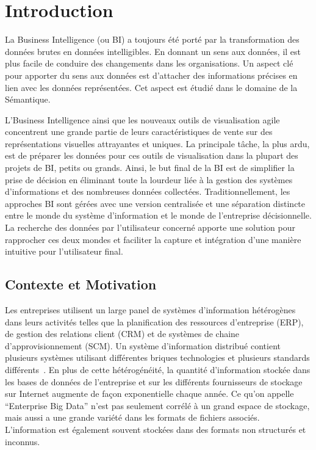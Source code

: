 \chapter{Introduction}\label{french-introduction}
\graphicspath{{summary/figures/}}

\newcommand{\bi}{Business Intelligence }

La Business Intelligence (ou BI) a toujours \'{e}t\'{e} port\'{e} par la transformation des donn\'{e}es brutes en donn\'{e}es intelligibles. En donnant un sens aux donn\'{e}es, il est plus facile de conduire des changements dans les organisations. Un aspect cl\'{e} pour apporter du sens aux donn\'{e}es est d'attacher des informations pr\'{e}cises en lien avec les donn\'{e}es repr\'{e}sent\'{e}es. Cet aspect est \'{e}tudi\'{e} dans le domaine de la S\'{e}mantique.

L'\bi ainsi que les nouveaux outils de visualisation agile concentrent une grande partie de leurs caract\'{e}ristiques de vente sur des repr\'{e}sentations visuelles attrayantes et uniques. La principale tâche, la plus ardu, est de pr\'{e}parer les donn\'{e}es pour ces outils de visualisation dans la plupart des projets de BI, petits ou grands. Ainsi, le but final de la BI est de simplifier la prise de d\'{e}cision en \'{e}liminant toute la lourdeur li\'{e}e à la gestion des syst\`{e}mes d'informations et des nombreuses donn\'{e}es collect\'{e}es. Traditionnellement, les approches BI sont g\'{e}r\'{e}es avec une version centralis\'{e}e et une s\'{e}paration distincte entre le monde du syst\`{e}me d'information et le monde de l'entreprise d\'{e}cisionnelle. La recherche des donn\'{e}es par l'utilisateur concern\'{e} apporte une solution pour rapprocher ces deux mondes et faciliter la capture et int\'{e}gration d'une mani\`{e}re intuitive pour l'utilisateur final.

\section{Contexte et Motivation}

Les entreprises utilisent un large panel de syst\`{e}mes d'information h\'{e}t\'{e}rog\`{e}nes dans leurs activit\'{e}s telles que la planification des ressources d'entreprise (ERP), de gestion des relations client (CRM) et de syst\`{e}mes de chaine d'approvisionnement (SCM). Un syst\`{e}me d'information distribu\'{e} contient plusieurs syst\`{e}mes utilisant diff\'{e}rentes briques technologies et plusieurs standards diff\'{e}rents~\cite{Mihindukulasooriya:COLD:13}. En plus de cette h\'{e}t\'{e}rog\'{e}n\'{e}it\'{e}, la quantit\'{e} d'information stock\'{e}e dans les bases de donn\'{e}es de l'entreprise et sur les diff\'{e}rents fournisseurs de stockage sur Internet augmente de façon exponentielle chaque ann\'{e}e. Ce qu'on appelle ``Enterprise Big Data'' n'est pas seulement corr\'{e}l\'{e} à un grand espace de stockage, mais aussi a une grande vari\'{e}t\'{e} dans les formats de fichiers associ\'{e}s. L'information est \'{e}galement souvent stock\'{e}es dans des formats non structur\'{e}s et inconnus.

